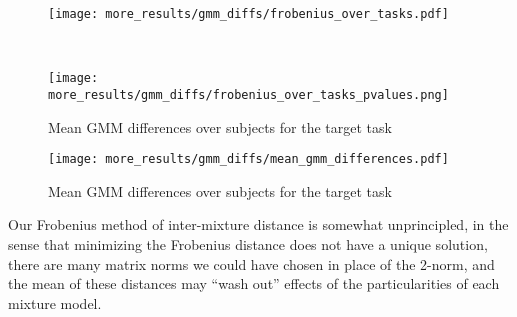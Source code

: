 \documentclass[../main.tex]{subfiles}
\begin{document}
\begin{figure}[!htb]
  \centering
  \begin{minipage}{\textwidth}
  \texttt{[image: more\_results/gmm\_diffs/frobenius\_over\_tasks.pdf]}
  \subcaption{}
\end{minipage}\\%
\begin{minipage}{\textwidth}
  \centering
  \texttt{[image: more\_results/gmm\_diffs/frobenius\_over\_tasks\_pvalues.png]}
  \subcaption{}
    \end{minipage}
    \caption[Mean GMM Frobenius differences over subjects]{Mean GMM differences over subjects for the target task}\label{fig:frobenius_diffs}
\end{figure}

\begin{figure}[!htb]
  \centering
    \texttt{[image: more\_results/gmm\_diffs/mean\_gmm\_differences.pdf]}
    \caption[Mean GMM Frobenius differences over subjects]{Mean GMM differences over subjects for the target task}\label{fig:frobenius_vs_reward}
\end{figure}

Our Frobenius method of inter-mixture distance is somewhat unprincipled, in the sense that minimizing the Frobenius distance does not have a unique solution, there are many matrix norms we could have chosen in place of the 2-norm, and the mean of these distances may ``wash out'' effects of the particularities of each mixture model.
\end{document}
